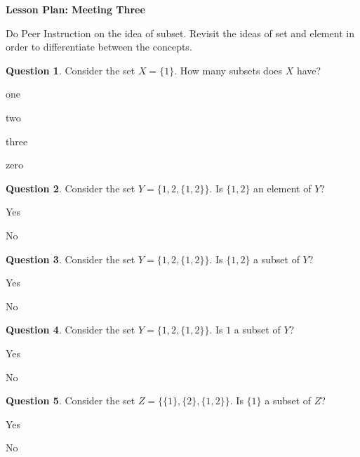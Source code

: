 \documentclass[12pt]{amsart}
\theoremstyle{definition}
\newtheorem{question}{Question}
\begin{document}
\begin{center}
\textbf{\Huge
Lesson Plan: Meeting Three
}
\end{center}
\vspace{.5in}

Do Peer Instruction on the idea of subset.
Revisit the ideas of set and element in order to differentiate between the concepts.

\begin{question}
Consider the set $X = \{1 \}$.
How many subsets does $X$ have?
\begin{compactitem}
\item one
\item two
\item three
\item zero
\end{compactitem}
\end{question}

\begin{question}
Consider the set $Y = \{1, 2, \{1,2\} \}$. Is $\{1,2\}$ an element of $Y$?
\begin{compactitem}
\item Yes
\item No
\end{compactitem}
\end{question}

\begin{question}
Consider the set $Y = \{1, 2, \{1,2\} \}$. Is $\{1,2\}$ a subset of $Y$?
\begin{compactitem}
\item Yes
\item No
\end{compactitem}
\end{question}

\begin{question}
Consider the set $Y = \{1, 2, \{1,2\} \}$. Is $1$ a subset of $Y$?
\begin{compactitem}
\item Yes
\item No
\end{compactitem}
\end{question}

\begin{question}
Consider the set $Z = \{ \{1\}, \{2\}, \{1, 2\} \}$. Is $\{1\}$ a subset of $Z$?
\begin{compactitem}
\item Yes
\item No
\end{compactitem}
\end{question}
\end{document}
